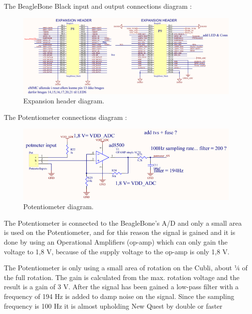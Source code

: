 The BeagleBone Black input and output connections diagram :\\
\begin{figure}[H]
  \centering
	\includegraphics[scale=0.92]{figures/ExpanionHeader.pdf}
	\caption{Expansion header diagram.}
	\label{labExpanionHeader}
\end{figure}\vspace{-5mm}

The Potentiometer connections diagram :\\

\begin{figure}[H]
	\centering
	\includegraphics[scale=0.92]{figures/Potmeter.pdf}
	\caption{Potentiometer diagram.}
	\label{labPotmeter}
\end{figure}\vspace{-5mm}

The Potentiometer is connected to the BeagleBone’s A/D and only a small area is used on the Potentiometer, and for this reason the signal is gained and it is done by using an Operational Amplifiers (op-amp) which can only gain the voltage to 1,8 V, because of the supply voltage to the op-amp is only 1,8 V.

The Potentiometer is only using a small area of rotation on the Cubli, about ¼ of the full rotation. The gain is calculated from the max. rotation voltage and the result is a gain of 3 V. After the signal has been gained a low-pass filter with a frequency of 194 Hz is added to damp noise on the signal. Since the sampling frequency is 100 Hz it is almost upholding New Quest by double or faster

